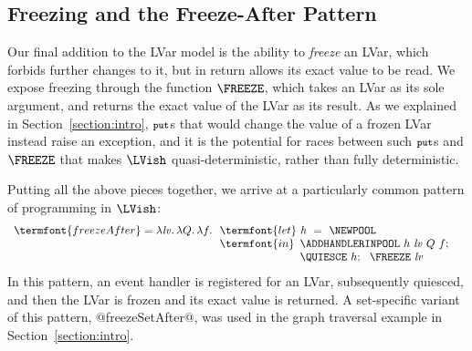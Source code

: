 \subsection{Freezing and the Freeze-After Pattern}\label{subsection:freeze-after}

Our final addition to the LVar model is the ability to \emph{freeze} an LVar,
which forbids further changes to it, but in return allows its exact value to be
read.  We expose freezing through the function $\FREEZE$, which takes an LVar as
its sole argument, and returns the exact value of the LVar as its result.  As we
explained in Section~\ref{section:intro}, $\mbox{\footnotesize \texttt{put}}$s that would change the value of a frozen
LVar instead raise an exception, and it is the potential for races between
such $\mbox{\footnotesize \texttt{put}}$s and $\FREEZE$ that makes $\LVish$ quasi-deterministic, rather than
fully deterministic.

Putting all the above pieces together, we arrive at a particularly common
pattern of programming in $\LVish$:
\[
\begin{array}[t]{l}
  \termfont{freezeAfter} = \lam{\mathit{lv}}{\lam{Q}{\lam{f}{}}}
  \begin{array}[t]{l}
    \termfont{let}~\mathit{h}~=~\NEWPOOL \\
    \termfont{in}
      \begin{array}[t]{l}  
        \ADDHANDLERINPOOL~h~\mathit{lv}~Q~f; 
\\
        \QUIESCE~h;~~
        \FREEZE~\mathit{lv}
      \end{array}
  \end{array}
\end{array}
\]
In this pattern, an event handler is registered for an LVar, subsequently
quiesced, and then the LVar is frozen and its exact value is returned.  A
set-specific variant of this pattern, @freezeSetAfter@, was used in the
graph traversal example in Section~\ref{section:intro}.
